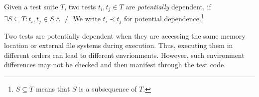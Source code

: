 


\begin{definition} \label{def:manifest}
Given a test suite\/ $T$, two tests\/ $t_i, t_j \in T$
are \textit{potentially} dependent, if\/ $\exists {S \subseteq T}: t_i, t_j \in S \wedge
$$ \neq $$.
$We write\/ $t_i \prec t_j$ for potential dependence.\footnote{$S \subseteq T$ means that $S$ is a subsequence of
$T$.}
\end{definition}

Two tests are potentially dependent when they are accessing the
same memory location or external file systems during execution.
Thus, executing them in different orders can lead to different envrionments. However,
such environment differences may not be checked and then manifest
through the test code.



